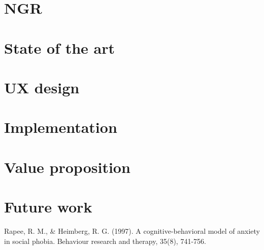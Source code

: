 \documentclass[letterpaper,12pt]{article}
\begin{document}
\section{NGR}
	
	\pagebreak
	
\section{State of the art}
	
	\pagebreak
	
\section{UX design}

\section{Implementation}
	
	\pagebreak
	
\section{Value proposition}

\section{Future work}



\begin{thebibliography}{99}

Rapee, R. M., \& Heimberg, R. G. (1997). A cognitive-behavioral model of anxiety in social phobia. Behaviour research and therapy, 35(8), 741-756.

\end{thebibliography}
\end{document}
